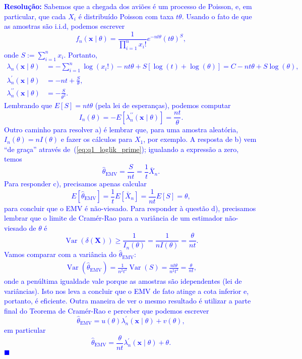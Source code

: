 \documentclass[a4paper,10pt, notitlepage]{report}
\newcommand{\vr}{\operatorname{Var}} %
\newcommand{\bX}{\boldsymbol{X}} %
\newcommand{\emv}{\hat{\theta}_{\text{EMV}}}
\begin{document}
\textcolor{blue}{
\textbf{Resolução:}
Sabemos que a chegada dos aviões é um processo de Poisson, e, em particular, que cada $X_i$ é distribuído Poisson com taxa $t\theta$.
Usando o fato de que as amostras são i.i.d, podemos escrever
\[ f_n(\boldsymbol{x} \mid \theta) = \frac{1}{\prod_{i=1}^n x_i!} e^{-nt\theta} \left(t\theta\right)^{S}, \]
onde $S := \sum_{i=1}^n x_i$.
Portanto,
\begin{align}
 \lambda_n(\boldsymbol{x} \mid \theta) &= -\sum_{i=1}^n \log(x_i!) -nt\theta + S[\log(t) +\log(\theta)] = C -nt\theta + S\log(\theta), \\
 \label{eq:q1_loglik_prime}
  \lambda_n^{\prime}(\boldsymbol{x} \mid \theta) &= -nt + \frac{S}{\theta}, \\
  \label{eq:q1_loglik_prime_prime}
   \lambda_n^{\prime\prime}(\boldsymbol{x} \mid \theta) &= -\frac{S}{\theta^2}.
\end{align}
Lembrando que $E[S] = nt\theta$ (pela lei de esperanças), podemos computar
\begin{equation}
 \label{eq:q1_Fisher_info}
  I_n(\theta) = -E[\lambda_n^{\prime\prime}(\boldsymbol{x} \mid \theta)] = \frac{nt}{\theta}.
\end{equation}
Outro caminho para resolver a) é lembrar que, para uma amostra aleatória,  $I_n(\theta) = nI(\theta)$ e fazer os cálculos para $X_1$, por exemplo.
A resposta de b) vem ``de graça'' através de~(\ref{eq:q1_loglik_prime}); igualando a expressão a zero, temos 
\begin{equation*}
 \emv = \frac{S}{nt} = \frac{1}{t} \bar{X}_n.
\end{equation*}
Para responder c), precisamos apenas calcular 
\[ E[ \emv] =  \frac{1}{t} E[\bar{X}_n] = \frac{1}{nt} E[S] = \theta, \]
para concluir que o EMV é não-viesado.
Para responder à questão d), precisamos lembrar que o limite de Cramér-Rao para a variância de um estimador não-viesado de $\theta$ é
\begin{equation*}
 \vr(\delta(\bX)) \geq \frac{1}{I_n(\theta)} = \frac{1}{nI(\theta)} = \frac{\theta}{nt}.
\end{equation*}
Vamos comparar com a variância do $\emv$:
\begin{align*}
 \vr(\emv) = \frac{1}{n^2t^2} \vr(S) = \frac{nt\theta}{n^2t^2} =  \frac{\theta}{nt},
\end{align*}
onde a penúltima igualdade vale porque as amostras são idependentes (lei de variâncias).
Isto nos leva a concluir que o EMV de fato atinge a cota inferior e, portanto, é eficiente.
Outra maneira de ver o mesmo resultado é utilizar a parte final do Teorema de Cramér-Rao e perceber que podemos escrever
\begin{equation*}
 \emv = u(\theta) \lambda_n^{\prime}(\boldsymbol{x} \mid \theta) + v(\theta),
\end{equation*}
em particular
\begin{equation*}
 \emv = \frac{\theta}{nt} \lambda_n^{\prime}(\boldsymbol{x} \mid \theta) + \theta.
\end{equation*}
$\blacksquare$
}
\end{document}
